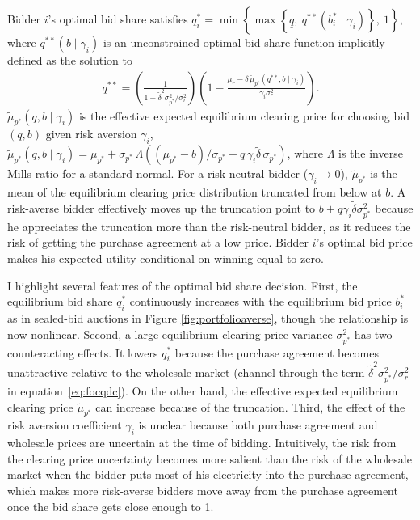 \documentclass[12pt]{article}
\theoremstyle{definition} %
\begin{document}
Bidder $i$'s optimal bid share satisfies $q_i^\ast = \min \left\{\max \left\{\underline{q},\ q^{\ast\ast}(b_i^\ast \mid \gamma_i) \right\},\ 1 \right\}$, where $q^{\ast\ast}(b \mid \gamma_i)$ is an unconstrained optimal bid share function implicitly defined as the solution to
\begin{align}
\label{eq:focqdc}
q^{\ast\ast} 
= \left( \frac{1}{1 + \tilde{\delta}^2 \sigma_{p^\ast}^2/\sigma_r^2} \right) 
\left( 1 - \frac{\mu_r - \tilde{\delta}\, \tilde{\mu}_{p^\ast}(q^{\ast\ast},b \mid \gamma_i)}{\gamma_i \sigma_r^2} \right).
\end{align}
$\tilde{\mu}_{p^\ast}(q,b \mid \gamma_i)$ is the effective expected equilibrium clearing price for choosing bid $(q,b)$ given risk aversion $\gamma_i$, $\tilde{\mu}_{p^\ast}(q,b \mid \gamma_i)= \mu_{p^\ast} + \sigma_{p^\ast}\, \Lambda ((\mu_{p^\ast} - b)/\sigma_{p^\ast} - q\, \gamma_i \tilde{\delta}\, \sigma_{p^\ast} )$, where $\Lambda$ is the inverse Mills ratio for a standard normal. For a risk-neutral bidder ($\gamma_i \to 0$), $\tilde{\mu}_{p^\ast}$ is the mean of the equilibrium clearing price distribution truncated from below at $b$. A risk-averse bidder effectively moves up the truncation point to $b + q \gamma_i \tilde{\delta} \sigma_{p^\ast}^2$ because he appreciates the truncation more than the risk-neutral bidder, as it reduces the risk of getting the purchase agreement at a low price. Bidder $i$'s optimal bid price makes his expected utility conditional on winning equal to zero.

I highlight several features of the optimal bid share decision. First, the equilibrium bid share $q_i^\ast$ continuously increases with the equilibrium bid price $b_i^\ast$ as in sealed-bid auctions in Figure \ref{fig:portfolioaverse}, though the relationship is now nonlinear. Second, a large equilibrium clearing price variance $\sigma_{p^\ast}^2$ has two counteracting effects. It lowers $q_i^\ast$ because the purchase agreement becomes unattractive relative to the wholesale market (channel through the term $\tilde{\delta}^2 \sigma_{p^\ast}^2/\sigma_r^2$ in equation~\eqref{eq:focqdc}). On the other hand, the effective expected equilibrium clearing price $\tilde{\mu}_{p^\ast}$ can increase because of the truncation. Third, the effect of the risk aversion coefficient $\gamma_i$ is unclear because both purchase agreement and wholesale prices are uncertain at the time of bidding. Intuitively, the risk from the clearing price uncertainty becomes more salient than the risk of the wholesale market when the bidder puts most of his electricity into the purchase agreement, which makes more risk-averse bidders move away from the purchase agreement once the bid share gets close enough to 1.
\end{document}

